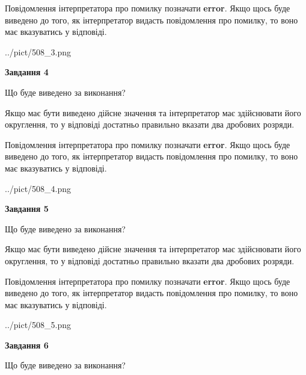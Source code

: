 \documentclass[12pt, ukrainian]{article}
\begin{document}
{\begin {Large}
Повідомлення інтерпретатора про помилку позначати \textbf{error}.
Якщо щось буде виведено до того, як інтерпретатор видасть повідомлення про помилку, 
то воно має вказуватись у відповіді. \par

\begin{center}
	{../pict/508_3.png}
\end{center}
\newpage

{\begin {center}\textbf{Завдання 4}\end {center}}\par
Що буде виведено за виконання? \par

Якщо має бути виведено дійсне значення та інтерпретатор має здійснювати його округлення, 
то у відповіді достатньо правильно вказати два дробових розряди.

Повідомлення інтерпретатора про помилку позначати \textbf{error}.
Якщо щось буде виведено до того, як інтерпретатор видасть повідомлення про помилку, 
то воно має вказуватись у відповіді. \par

\begin{center}
	{../pict/508_4.png}
\end{center}
\newpage

{\begin {center}\textbf{Завдання 5}\end {center}}\par
Що буде виведено за виконання? \par

Якщо має бути виведено дійсне значення та інтерпретатор має здійснювати його округлення, 
то у відповіді достатньо правильно вказати два дробових розряди.

Повідомлення інтерпретатора про помилку позначати \textbf{error}.
Якщо щось буде виведено до того, як інтерпретатор видасть повідомлення про помилку, 
то воно має вказуватись у відповіді. \par

\begin{center}
	{../pict/508_5.png}
\end{center}
\newpage

{\begin {center}\textbf{Завдання 6}\end {center}}\par
Що буде виведено за виконання? \par


\end{Large}}
\end{document}
